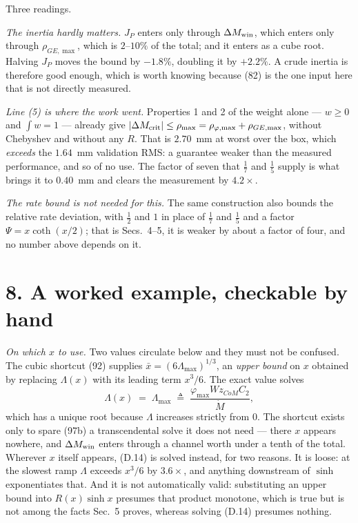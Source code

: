 \documentclass[11pt]{article}
\newcommand{\Wz}{W\!z_{CoM}}
\begin{document}
Three readings.

\emph{The inertia hardly matters.} $J_P$ enters only through
$\Delta M_{\rm win}$, which enters only through $\rho_{GE,\max}$, which
is $2$--$10\%$ of the total; and it enters as a cube root. Halving
$J_P$ moves the bound by $-1.8\%$, doubling it by $+2.2\%$. A crude
inertia is therefore good enough, which is worth knowing because (82)
is the one input here that is not directly measured.

\emph{Line (5) is where the work went.} Properties 1 and 2 of the
weight alone --- $w\ge0$ and $\int w = 1$ --- already give
$|\Delta M_{\rm crit}|\le\rho_{\max} = \rho_{\varphi,\max} +
\rho_{GE,\max}$, without Chebyshev and without any $R$. That is
$2.70$~mm at worst over the box, which \emph{exceeds} the $1.64$~mm
validation RMS: a guarantee weaker than the measured performance, and
so of no use. The factor of seven that $\tfrac17$ and $\tfrac15$ supply
is what brings it to $0.40$~mm and clears the measurement by $4.2\times$.

\emph{The rate bound is not needed for this.} The same construction
also bounds the relative rate deviation, with $\tfrac12$ and $1$ in
place of $\tfrac17$ and $\tfrac15$ and a factor $\Psi = x\coth(x/2)$;
that is Secs.~4--5, it is weaker by about a factor of four, and no
number above depends on it.

\section*{8. A worked example, checkable by hand}

\emph{On which $x$ to use.} Two values circulate below and they must not
be confused. The cubic shortcut (92) supplies $\bar x =
(6\Lambda_{\max})^{1/3}$, an \emph{upper bound} on $x$ obtained by
replacing $\Lambda(x)$ with its leading term $x^3/6$. The exact value
solves
\begin{equation}
  \Lambda(x) \;=\; \Lambda_{\max}
  \;\triangleq\; \frac{\varphi_{\max}\Wz C_2}{\dot M},
  \tag{D.14}
\end{equation}
which has a unique root because $\Lambda$ increases strictly from $0$.
The shortcut exists only to spare (97b) a transcendental solve it does
not need --- there $x$ appears nowhere, and $\Delta M_{\rm win}$ enters
through a channel worth under a tenth of the total. Wherever $x$ itself
appears, (D.14) is solved instead, for two reasons. It is loose: at the
slowest ramp $\Lambda$ exceeds $x^3/6$ by $3.6\times$, and anything
downstream of $\sinh$ exponentiates that. And it is not automatically
valid: substituting an upper bound into $R(x)\sinh x$ presumes that
product monotone, which is true but is not among the facts Sec.~5
proves, whereas solving (D.14) presumes nothing.
\end{document}

